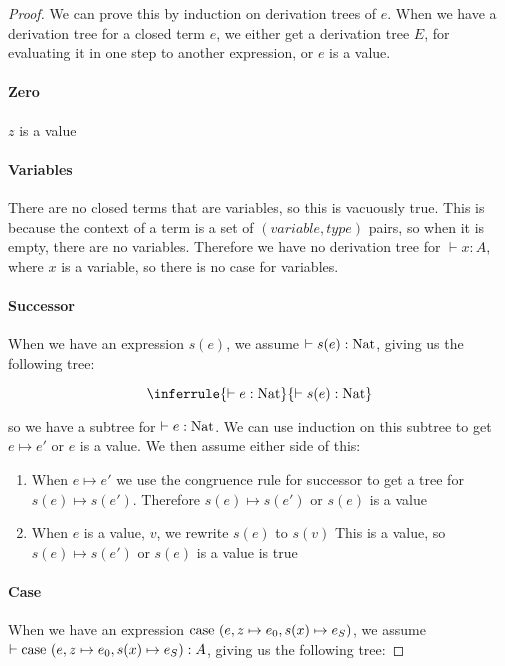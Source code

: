 \begin{proof}
We can prove this by induction on derivation trees of $e$. When we have a derivation tree for a closed term $e$, we either get a derivation tree $E$, for evaluating it in one step to another expression, or $e$ is a value.  

\paragraph{Zero} $z$ is a value

\paragraph{Variables} There are no closed terms that are variables, so this is vacuously true. This is because the context of a term is a set of $(variable, type)$ pairs, so when it is empty, there are no variables. Therefore we have no derivation tree for $\vdash x : A$, where $x$ is a variable, so there is no case for variables.

\paragraph{Successor} When we have an expression $s(e)$, we assume $\vdash s(e) : \operatorname{Nat}$, giving us the following tree:

$$
\inferrule {\vdash e : \nat }
 {\vdash s(e) : \nat}
$$

so we have a subtree for $\vdash e : \operatorname{Nat}$. We can use induction on this subtree to get $e \mapsto e'$ or $e$ is a value. We then assume either side of this:

\begin{enumerate}
\item{When $e \mapsto e'$ we use the congruence rule for successor to get a tree for $s(e) \mapsto s(e')$. Therefore $s(e) \mapsto s(e')$ or $s(e)$ is a value}
\item{When $e$ is a value, $v$, we rewrite $s(e)$ to $s(v)$ This is a value, so $s(e) \mapsto s(e')$ or $s(e)$ is a value is true}
\end{enumerate}


\paragraph{Case} When we have an expression $\operatorname{case}  \ (e,z \mapsto e_0, s(x) \mapsto e_S)$, we assume $\vdash \operatorname{case}  \ (e,z \mapsto e_0, s(x) \mapsto e_S) :A$, giving us the following tree:


\end{proof}
